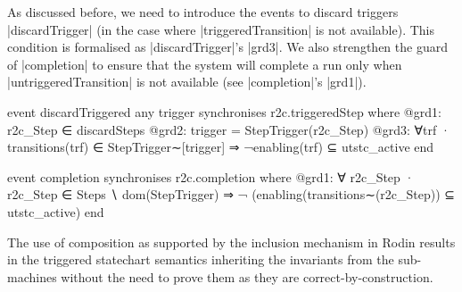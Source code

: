 As discussed before, we need to introduce the events to discard triggers |discardTrigger| (in the case where |triggeredTransition| is not available). This condition is formalised as  |discardTrigger|'s |grd3|. We also strengthen the guard of |completion| to ensure that the system will complete a run only when |untriggeredTransition| is not available (see |completion|'s |grd1|).
\begin{center}
    \begin{minipage}[t]{0.50\textwidth}
\begin{EventBcode}
event discardTriggered
any trigger
synchronises r2c.triggeredStep
where
    @grd1: r2c_Step ∈ discardSteps
    @grd2: trigger = StepTrigger(r2c_Step)
    @grd3: ∀trf · transitions(trf) ∈ StepTrigger∼[{trigger}] ⇒ ¬enabling(trf) ⊆ utstc_active  
end
\end{EventBcode}
    \end{minipage}
    \hfill
    \begin{minipage}[t]{0.48\textwidth}
\begin{EventBcode}
event completion
synchronises r2c.completion
where
    @grd1: 
        ∀ r2c_Step · r2c_Step ∈ Steps ∖ dom(StepTrigger)
	⇒
    ¬ (enabling(transitions∼(r2c_Step)) ⊆ utstc_active)
	end
\end{EventBcode}
    \end{minipage}
\end{center}

The use of composition as supported by the inclusion mechanism in Rodin results in the triggered statechart semantics inheriting the invariants from the sub-machines without the need to prove them as they are correct-by-construction.



